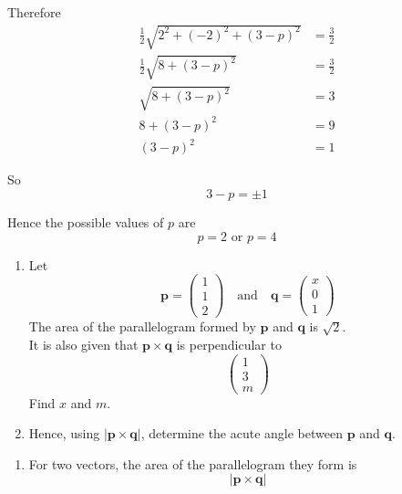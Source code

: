 \documentclass[leqno]{article}
\begin{document}
\begin{enumerate}[
  label=\textbf{\arabic*.},
  leftmargin=*,
  topsep=0pt,
  partopsep=0pt,
  parsep=0pt
]
\begin{djsSolution}
\begin{enumerate}[label=\textbf{(\alph*)}]
  Therefore
  \begin{align*}
  \frac12\sqrt{2^2+(-2)^2+(3-p)^2}&=\frac32 \\
  \frac12\sqrt{8+(3-p)^2}&=\frac32 \\
  \sqrt{8+(3-p)^2}&=3 \\
  8+(3-p)^2&=9 \\
  (3-p)^2&=1
  \end{align*}

  So
  \[
  3-p=\pm 1
  \]

  Hence the possible values of \(p\) are
  \[
  p=2 \text{ or } p=4
  \]
\end{enumerate}
\end{djsSolution}


\newpage

\questionitem

\begin{enumerate}[label=\textbf{(\alph*)}]
  \item Let
  \[
  \mathbf{p}=\begin{pmatrix}1\\1\\2\end{pmatrix}
  \quad\text{and}\quad
  \mathbf{q}=\begin{pmatrix}x\\0\\1\end{pmatrix}
  \]
  The area of the parallelogram formed by $\mathbf{p}$ and $\mathbf{q}$ is $\sqrt{2}$.\\
  It is also given that $\mathbf{p}\times\mathbf{q}$ is perpendicular to
  \[
  \begin{pmatrix}1\\3\\m\end{pmatrix}
  \]
  Find $x$ and $m$.  \\
  \item Hence, using $|\mathbf{p}\times\mathbf{q}|$, determine the acute angle between $\mathbf{p}$ and $\mathbf{q}$.  \\
\end{enumerate}

\vspace*{10pt}

\begin{djsSolution}
\begin{enumerate}[label=\textbf{(\alph*)}]
  \item For two vectors, the area of the parallelogram they form is
\[
|\mathbf p\times \mathbf q|
\]


\end{enumerate}
\end{djsSolution}
\end{enumerate}
\end{document}
